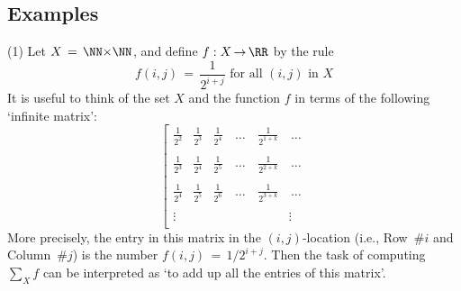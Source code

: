 \V
\V

            \subsection{\small{\bf Examples}}
            \label{ExampG20.80}

    \hspace*{\parindent}(1) Let $X \,=\, {\NN}{\times}{\NN}$, and define $f:X \,{\rightarrow}\, {\RR}$ by the rule
        \begin{displaymath}
        f(i,j) \,=\, \frac{1}{2^{i+j}} \mbox{ for all $(i,j)$ in $X$}
        \end{displaymath}
    It is useful to think of the set $X$ and the function $f$ in terms
    of the following `infinite matrix':
        \begin{displaymath}
        \left[
        \begin{array}{lllclc}
        {\displaystyle \frac{1}{2^{2}}} & {\displaystyle \frac{1}{2^{3}}} & {\displaystyle \frac{1}{2^{4}}} & \,{\ldots}\, & {\displaystyle \frac{1}{2^{1+k}}} & \,{\ldots}\, \\
    &  &  &  &  &  \\
        {\displaystyle \frac{1}{2^{3}}} & {\displaystyle \frac{1}{2^{4}}} & {\displaystyle \frac{1}{2^{5}}} & \,{\ldots}\, & {\displaystyle \frac{1}{2^{2+k}}} & \,{\ldots}\, \\
    &  &  &  &  &  \\
        {\displaystyle \frac{1}{2^{4}}} & {\displaystyle \frac{1}{2^{5}}} & {\displaystyle \frac{1}{2^{6}}} & \,{\ldots}\, & {\displaystyle \frac{1}{2^{3+k}}} & \,{\ldots}\, \\
    &  &  &  &  &  \\
{\vdots} &  &  &  &  & {\vdots}  \\
        \end{array}
                \right.
        \end{displaymath}
    More precisely, the entry in this matrix in the $(i,j)$-location (i.e., Row~\#$i$ and Column~\#$j$) is the number $f(i,j) \,=\, 1/2^{i+j}$.
    Then the task of computing ${\sum}_{X} f$ can be interpreted as `to add up all the entries of this matrix'.

